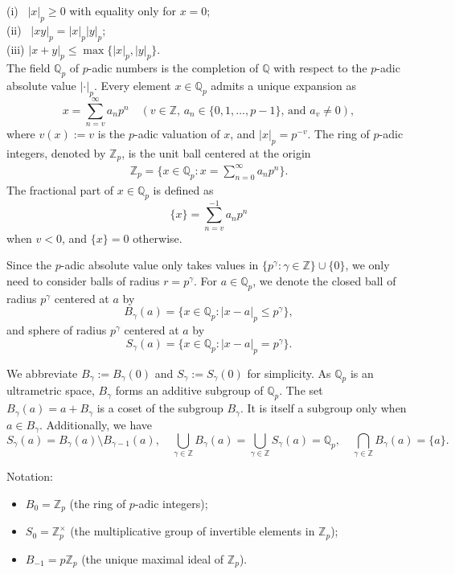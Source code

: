 \documentclass[a4paper,12pt]{amsart}
\def\Zp{\mathbb{Z}_p}
\def\Qp{\mathbb{Q}_p}
\newcommand{\abspp}[1]{|#1|_p}
\begin{document}
\indent (i)  \  $|x|_p\ge 0$ with equality only for $x=0$; \\
\indent (ii) \ $|x y|_p=|x|_p |y|_p$;\\
\indent (iii) $|x+y|_p\le \max\{ |x|_p, |y|_p\}$.\\

The field \(\Qp\) of \(p\)-adic numbers is the completion of \(\mathbb{Q}\) with respect to the
\(p\)-adic absolute value \(|\cdot|_p\). Every element \(x \in \Qp\) admits a unique expansion as
\[
x = \sum_{n=v}^{\infty} a_n p^n \quad \left(v \in \mathbb{Z}, \, a_n \in \{0, 1, \dots, p-1\}, \, \text{and } a_v \neq 0\right),
\]
where \(v(x) := v\) is the \(p\)-adic valuation of \(x\), and \(|x|_p= p^{-v}\).
The ring of \(p\)-adic integers, denoted by \(\Zp\), is the unit ball centered at the origin
\begin{align}\label{element}
\Zp = \Big\{x \in \Qp : x = \sum_{n=0}^{\infty} a_n p^n\Big\}.
\end{align}
The fractional part of \(x \in \Qp\) is defined as
\[
\{x\} = \sum_{n=v}^{-1} a_n p^n
\] when \(v<0\), and  \(\{x\}=0\) otherwise.

Since the \(p\)-adic absolute value only takes values in \(\{p^\gamma : \gamma \in \mathbb{Z}\} \cup \{0\}\), we only need to consider balls of radius \(r = p^\gamma\). For \(a \in \Qp\), we denote
the closed ball of radius \(p^\gamma\) centered at \(a\) by\[B_\gamma(a) = \big\{x \in \Qp : \abspp{x-a} \leq p^\gamma\big\},\]
and sphere of radius \(p^\gamma\) centered at \(a\) by \[S_\gamma(a) = \big\{x \in \Qp : \abspp{x-a} = p^\gamma\big\}.\]


We abbreviate \(B_\gamma := B_\gamma(0)\) and \(S_\gamma := S_\gamma(0)\) for simplicity.
As \(\Qp\) is an ultrametric space, \(B_\gamma\) forms an additive subgroup of \(\Qp\).
The set \(B_\gamma(a)=a+B_\gamma\) is a coset of the subgroup \(B_\gamma\).
It is itself a subgroup only when \(a \in B_\gamma\). Additionally, we have
\[
S_\gamma(a) = B_\gamma(a) \setminus B_{\gamma-1}(a), \quad \bigcup_{\gamma \in \mathbb{Z}} B_\gamma(a) = \bigcup_{\gamma \in \mathbb{Z}} S_\gamma(a) = \Qp, \quad \bigcap_{\gamma \in \mathbb{Z}} B_\gamma(a) = \{a\}.
\]

Notation:
\begin{itemize}
    \item \(B_0 = \Zp\) (the ring of \(p\)-adic integers);
    \item \(S_0 = \Zp^\times\) (the multiplicative group of invertible elements in \(\Zp\));
    \item \(B_{-1} = p\Zp\) (the unique maximal ideal of \(\Zp\)).
\end{itemize}
\end{document}
